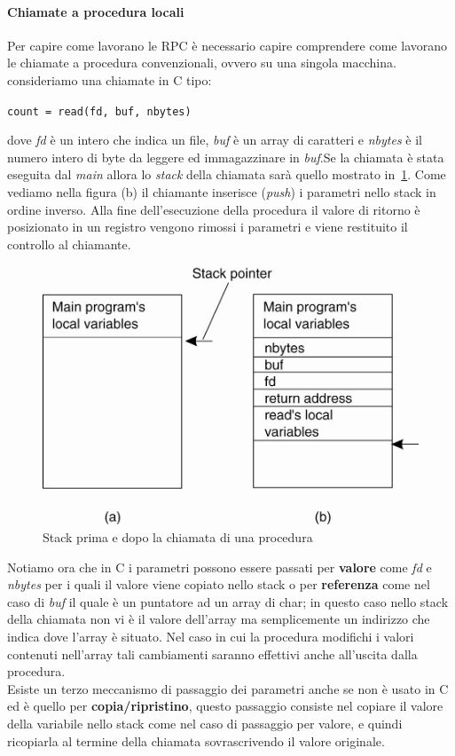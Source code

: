 \paragraph{Chiamate a procedura locali}
Per capire come lavorano le RPC è necessario capire comprendere come lavorano le chiamate a procedura convenzionali, ovvero su una singola macchina.
consideriamo una chiamate in C tipo:
\begin{center}
\texttt{count = read(fd, buf, nbytes)}
\end{center}
dove \emph{fd} è un intero che indica un file, \emph{buf} è un array di caratteri e \emph{nbytes} è il numero intero di byte da leggere ed immagazzinare in \emph{buf}.Se la chiamata è stata eseguita dal \emph{main} allora lo \emph{stack} della chiamata sarà quello mostrato in \figurename\,\ref{img:localstack}. Come vediamo nella figura (b) il chiamante inserisce (\emph{push}) i parametri nello stack in ordine inverso. Alla fine dell'esecuzione della procedura il valore di ritorno è posizionato in un registro vengono rimossi i parametri e viene restituito il controllo al chiamante.\\
\begin{figure}
\centering
\includegraphics[scale=0.5]{img/localstack.png}
\caption{Stack prima e dopo la chiamata di una procedura}\label{img:localstack}
\end{figure}
Notiamo ora che in C i parametri possono essere passati per \textbf{valore} come \emph{fd} e \emph{nbytes} per i quali il valore viene copiato nello stack o per \textbf{referenza} come nel caso di \emph{buf} il quale è un puntatore ad un array di char; in questo caso nello stack della chiamata non vi è il valore dell'array ma semplicemente un indirizzo che indica dove l'array è situato. Nel caso in cui la procedura modifichi i valori contenuti nell'array tali cambiamenti saranno effettivi anche all'uscita dalla procedura.\\
Esiste un terzo meccanismo di passaggio dei parametri anche se non è usato in C ed è quello per \textbf{copia/ripristino}, questo passaggio consiste nel copiare il valore della variabile nello stack come nel caso di passaggio per valore, e quindi ricopiarla al termine della chiamata sovrascrivendo il valore originale. 
